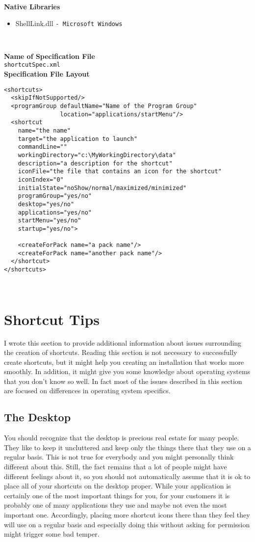 \textbf{Native Libraries}
\begin{itemize}
\item ShellLink.dll \texttt{- Microsoft Windows}
\end{itemize}\

\textbf{Name of Specification File}\\
\texttt{shortcutSpec.xml}\\

\textbf{Specification File Layout}
\footnotesize
\begin{verbatim}
<shortcuts>
  <skipIfNotSupported/>
  <programGroup defaultName="Name of the Program Group" 
                location="applications/startMenu"/>
  <shortcut 
    name="the name"
    target="the application to launch"
    commandLine=""
    workingDirectory="c:\MyWorkingDirectory\data"
    description="a description for the shortcut"
    iconFile="the file that contains an icon for the shortcut" 
    iconIndex="0"
    initialState="noShow/normal/maximized/minimized"
    programGroup="yes/no"
    desktop="yes/no" 
    applications="yes/no" 
    startMenu="yes/no" 
    startup="yes/no">
  
    <createForPack name="a pack name"/>
    <createForPack name="another pack name"/>
  </shortcut>
</shortcuts>
\end{verbatim}\
\normalsize

\section{Shortcut Tips}

I wrote this section to provide additional information about issues
surrounding the creation of shortcuts. Reading this section is not
necessary to successfully create shortcuts, but it might help you
creating an installation that works more smoothly. In addition, it might
give you some knowledge about operating systems that you don't know so
well. In fact most of the issues described in this section are focused
on differences in operating system specifics.\\

\subsection{The Desktop}

You should recognize that the desktop is precious real estate for many
people. They like to keep it uncluttered and keep only the things there
that they use on a regular basis. This is not true for everybody and you
might personally think different about this. Still, the fact remains
that a lot of people might have different feelings about it, so you
should not automatically assume that it is ok to place all of your
shortcuts on the desktop proper. While your application is certainly one
of the most important things for you, for your customers it is probably
one of many applications they use and maybe not even the most important
one. Accordingly, placing more shortcut icons there than they feel they
will use on a regular basis and especially doing this without asking for
permission might trigger some bad temper.\\

